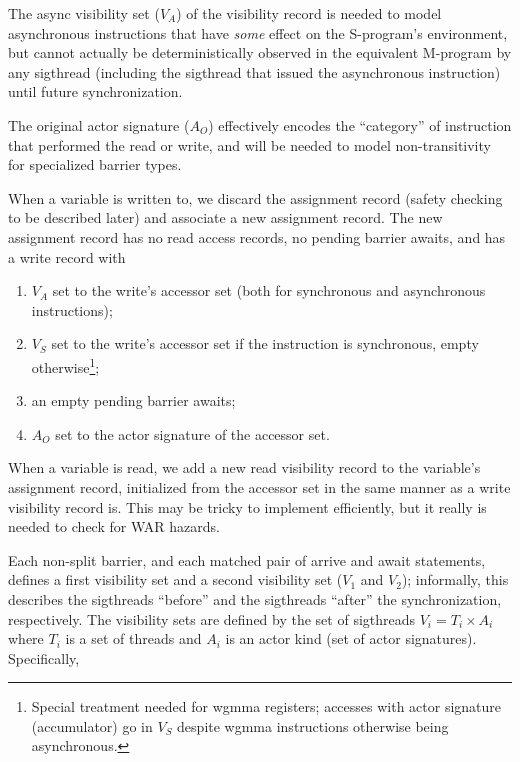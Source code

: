 \filbreak
The async visibility set ($V_A$) of the visibility record is needed to model asynchronous instructions that have \textit{some} effect on the S-program's environment, but cannot actually be deterministically observed in the equivalent M-program by any sigthread (including the sigthread that issued the asynchronous instruction) until future synchronization.

\filbreak
The original actor signature ($A_O$) effectively encodes the ``category'' of instruction that performed the read or write, and will be needed to model non-transitivity for specialized barrier types.

\filbreak
{} When a variable is written to, we discard the assignment record (safety checking to be described later) and associate a new assignment record.
The new assignment record has no read access records, no pending barrier awaits, and has a write record with

\filbreak
\begin{enumerate}
  \item $V_A$ set to the write's accessor set (both for synchronous and asynchronous instructions);
  \item $V_S$ set to the write's accessor set if the instruction is synchronous, empty otherwise\footnote{Special treatment needed for wgmma registers; accesses with actor signature  (accumulator) go in $V_S$ despite wgmma instructions otherwise being asynchronous.};
  \item an empty pending barrier awaits;
  \item $A_O$ set to the actor signature of the accessor set.
\end{enumerate}

\filbreak
{} When a variable is read, we add a new read visibility record to the variable's assignment record, initialized from the accessor set in the same manner as a write visibility record is.
This may be tricky to implement efficiently, but it really is needed to check for WAR hazards.

\filbreak
{} Each non-split barrier, and each matched pair of arrive and await statements, defines a first visibility set and a second visibility set ($V_1$ and $V_2$); informally, this describes the sigthreads ``before'' and the sigthreads ``after'' the synchronization, respectively.
The visibility sets are defined by the set of sigthreads $V_i = T_i \times A_i$ where $T_i$ is a set of threads and $A_i$ is an actor kind (set of actor signatures).
Specifically,

